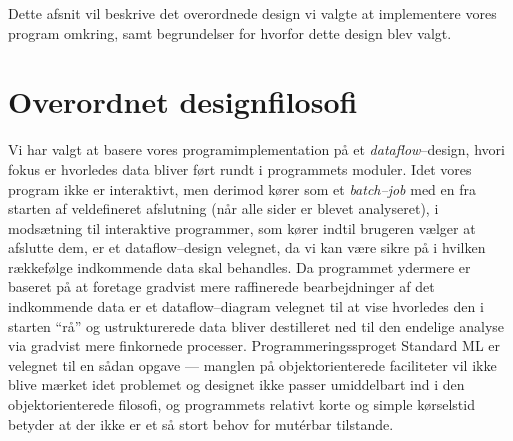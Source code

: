 \documentclass[a4paper,oneside]{memoir}
\begin{document}
Dette afsnit vil beskrive det overordnede design vi valgte at
implementere vores program omkring, samt begrundelser for hvorfor
dette design blev valgt.

\section{Overordnet designfilosofi}
\label{overordnetdesign}
Vi har valgt at basere vores programimplementation på et
\textit{dataflow}--design, hvori fokus er hvorledes data bliver ført
rundt i programmets moduler. Idet vores program ikke er interaktivt,
men derimod kører som et \textit{batch--job} med en fra starten af
veldefineret afslutning (når alle sider er blevet analyseret), i
modsætning til interaktive programmer, som kører indtil brugeren
vælger at afslutte dem, er et dataflow--design velegnet, da vi kan
være sikre på i hvilken rækkefølge indkommende data skal behandles. Da
programmet ydermere er baseret på at foretage gradvist mere
raffinerede bearbejdninger af det indkommende data er et
dataflow--diagram velegnet til at vise hvorledes den i starten ``rå''
og ustrukturerede data bliver destilleret ned til den endelige analyse
via gradvist mere finkornede processer. Programmeringssproget Standard
ML er velegnet til en sådan opgave --- manglen på objektorienterede
faciliteter vil ikke blive mærket idet problemet og designet ikke
passer umiddelbart ind i den objektorienterede filosofi, og
programmets relativt korte og simple kørselstid betyder at der ikke er
et så stort behov for mutérbar tilstande. 
\end{document}
